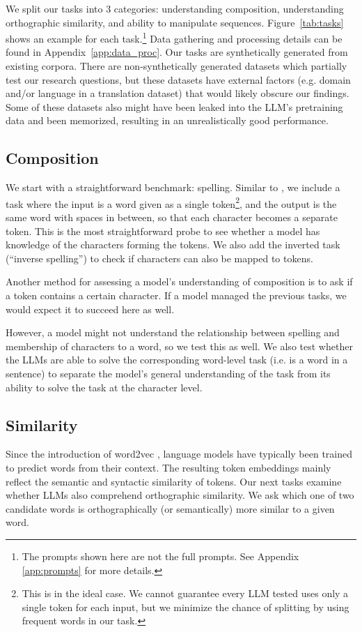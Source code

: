 We split our tasks into 3 categories: understanding composition, understanding orthographic similarity, and ability to manipulate sequences. 
Figure~\ref{tab:tasks} shows an example for each task.\footnote{The prompts shown here are not the full prompts. See Appendix \ref{app:prompts} for more details.} Data gathering and processing details can be found in Appendix~\ref{app:data_proc}. Our tasks are synthetically generated from existing corpora. There are non-synthetically generated datasets which partially test our research questions, but these datasets have external factors (e.g. domain and/or language in a translation dataset) that would likely obscure our findings. Some of these datasets also might have been leaked into the LLM's pretraining data and been memorized, resulting in an unrealistically good performance.

\subsection{Composition}
We start with a straightforward benchmark: spelling. Similar to \citet{itzhak-levy-2022-models}, we include a task where the input is a word given as a single token\footnote{This is in the ideal case. We cannot guarantee every LLM tested uses only a single token for each input, but we minimize the chance of splitting by using frequent words in our task.}, and the output is the same word with spaces in between, so that each character becomes a separate token. This is the most straightforward probe to see whether a model has knowledge of the characters forming the tokens. We also add the inverted task (``inverse spelling'') to check if characters can also be mapped to tokens. 

Another method for assessing a model's understanding of composition is to ask if a token contains a certain character. If a model managed the previous tasks, we would expect it to succeed here as well.

However, a model might not understand the relationship between spelling and membership of characters to a word, so we test this as well. We also test whether the LLMs are able to solve the corresponding word-level task (i.e. is a word in a sentence) to separate the model's general understanding of the task from its ability to solve the task at the character level.

\subsection{Similarity}
Since the introduction of word2vec \cite{mikolov2013efficient}, language models have typically been trained to predict words from their context. The resulting token embeddings mainly reflect the semantic and syntactic similarity of tokens. Our next tasks examine whether LLMs also comprehend orthographic similarity. We ask which one of two candidate words is orthographically (or semantically) more similar to a given word.

